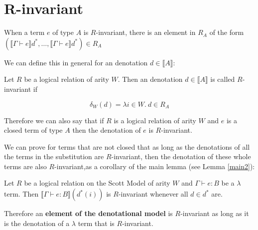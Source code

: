 \section{R-invariant}

When a term $e$ of type $A$ is $R$-invariant, there is an element in $R_A$ of the form $(\llbracket \Gamma \vdash e \rrbracket d^*, \dots , \llbracket \Gamma \vdash e \rrbracket d^*) \in R_A$

We can define this in general for an denotation $d \in \llbracket A \rrbracket$:

\vspace{0.5cm}

\begin{defn}
Let $R$ be a logical relation of arity $W$. Then an denotation $d \in \llbracket A \rrbracket$ is called $R$-invariant if 

\[\delta_W(d) = \lambda i \in W. \ d \in R_A \]
\end{defn}

Therefore we can also say that if $R$ is a logical relation of arity $W$ and $e$ is a closed term of type $A$ then the denotation of $e$ is $R$-invariant.

We can prove for terms that are not closed that as long as the denotations of all the terms in the substitution are $R$-invariant, then the denotation of these whole terms are also $R$-invariant,as a corollary of the main lemma (see Lemma \ref{main2}):

\vspace{0.5cm}

\begin{cor}{\citep{Streicher06}}
Let $R$ be a logical relation on the Scott Model of arity $W$ and $\Gamma \vdash e : B$ be a $\lambda$ term. Then $\llbracket \Gamma \vdash e : B \rrbracket(d^*(i))$ is $R$-invariant whenever all $d \in d^*$ are.
\end{cor}



Therefore an \textbf{element of the denotational model} is $R$-invariant as long as it is the denotation of a $\lambda$ term that is $R$-invariant.

